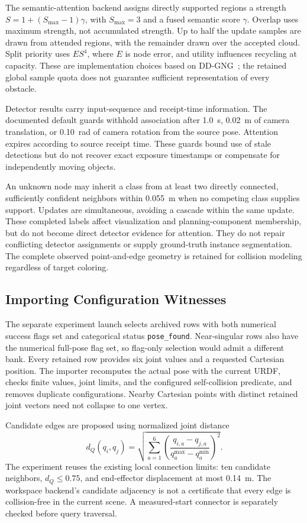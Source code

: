 \documentclass[letterpaper,10pt,conference]{ieeeconf}
\begin{document}
The semantic-attention backend assigns directly supported regions a strength $S=1+(S_{\max}-1)\gamma$, with $S_{\max}=3$ and a fused semantic score $\gamma$. Overlap uses maximum strength, not accumulated strength. Up to half the update samples are drawn from attended regions, with the remainder drawn over the accepted cloud. Split priority uses $ES^4$, where $E$ is node error, and utility influences recycling at capacity. These are implementation choices based on DD-GNG~\cite{saputra2023ddgng}; the retained global sample quota does not guarantee sufficient representation of every obstacle.

Detector results carry input-sequence and receipt-time information. The documented default guards withhold association after 1.0~s, 0.02~m of camera translation, or 0.10~rad of camera rotation from the source pose. Attention expires according to source receipt time. These guards bound use of stale detections but do not recover exact exposure timestamps or compensate for independently moving objects.

An unknown node may inherit a class from at least two directly connected, sufficiently confident neighbors within 0.055~m when no competing class supplies support. Updates are simultaneous, avoiding a cascade within the same update. These completed labels affect visualization and planning-component membership, but do not become direct detector evidence for attention. They do not repair conflicting detector assignments or supply ground-truth instance segmentation. The complete observed point-and-edge geometry is retained for collision modeling regardless of target coloring.

\subsection{Importing Configuration Witnesses}
The separate experiment launch selects archived rows with both numerical success flags set and categorical status \texttt{pose\_found}. Near-singular rows also have the numerical full-pose flag set, so flag-only selection would admit a different bank. Every retained row provides six joint values and a requested Cartesian position. The importer recomputes the actual pose with the current URDF, checks finite values, joint limits, and the configured self-collision predicate, and removes duplicate configurations. Nearby Cartesian points with distinct retained joint vectors need not collapse to one vertex.

Candidate edges are proposed using normalized joint distance
\begin{equation}
 d_Q(q_i,q_j)=\sqrt{\sum_{a=1}^{6}
 \left(\frac{q_{i,a}-q_{j,a}}{q_a^{\max}-q_a^{\min}}\right)^2}.
\end{equation}
The experiment reuses the existing local connection limits: ten candidate neighbors, $d_Q\le0.75$, and end-effector displacement at most 0.14~m. The workspace backend's candidate adjacency is not a certificate that every edge is collision-free in the current scene. A measured-start connector is separately checked before query traversal.
\end{document}
